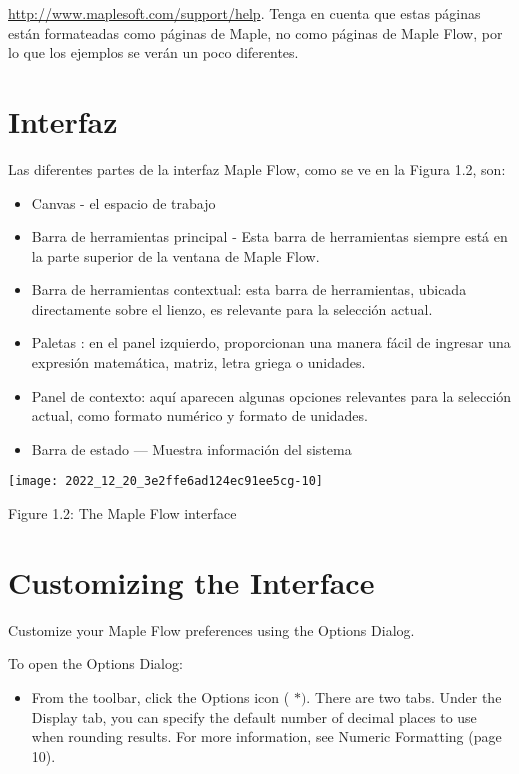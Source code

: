 \href{http://www.maplesoft.com/support/help}{http://www.maplesoft.com/support/help}. Tenga en cuenta que estas páginas están formateadas como páginas de Maple, no como páginas de Maple Flow, por lo que los ejemplos se verán un poco diferentes.

\section{Interfaz}
Las diferentes partes de la interfaz Maple Flow, como se ve en la Figura 1.2, son:

\begin{itemize}
  \item Canvas - el espacio de trabajo

\item Barra de herramientas principal - Esta barra de herramientas siempre está en la parte superior de la ventana de Maple Flow.

\item Barra de herramientas contextual: esta barra de herramientas, ubicada directamente sobre el lienzo, es relevante para la selección actual.

\item Paletas : en el panel izquierdo, proporcionan una manera fácil de ingresar una expresión matemática, matriz, letra griega o unidades.

\item Panel de contexto: aquí aparecen algunas opciones relevantes para la selección actual, como formato numérico y formato de unidades.

\item Barra de estado — Muestra información del sistema
\end{itemize}

\begin{center}
\texttt{[image: 2022\_12\_20\_3e2ffe6ad124ec91ee5cg-10]}
\end{center}

Figure 1.2: The Maple Flow interface

\section{Customizing the Interface}
Customize your Maple Flow preferences using the Options Dialog.

To open the Options Dialog:

\begin{itemize}
  \item From the toolbar, click the Options icon ( $\boldsymbol{*})$. There are two tabs. Under the Display tab, you can specify the default number of decimal places to use when rounding results. For more information, see Numeric Formatting (page 10).
\end{itemize}

